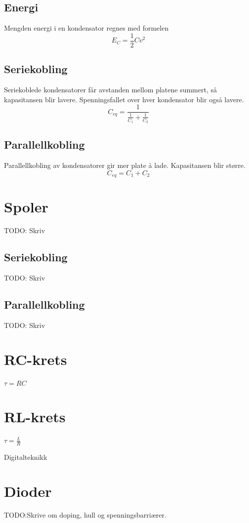 \documentclass[12pt,a4paper,norsk]{article}
\newcommand{\resi}[1]{\frac{1}{#1}}
\begin{document}
\subsection{Energi}
Mengden energi i en kondensator regnes med formelen
\[E_{C} = \resi{2} C v^{2}\]

\subsection{Seriekobling}
Seriekoblede kondensatorer får avstanden mellom platene summert, så kapasitansen
blir lavere. Spenningsfallet over hver kondensator blir også lavere.
\[C_{eq} = \resi{\resi{C_{1}}+\resi{C_{2}}}\]

\subsection{Parallellkobling}
Parallellkobling av kondensatorer gir mer plate å lade. Kapasitansen blir større.
\[C_{eq} = C_{1} + C_{2}\]

\section{Spoler}\label{sec:spoler}
TODO\@: Skriv
\subsection{Seriekobling}
TODO\@: Skriv
\subsection{Parallellkobling}
TODO\@: Skriv

\section{RC-krets}
$\tau = RC$

\section{RL-krets}
$\tau = \frac{L}{R}$

\clearpage
{}
\begin{center}
  {\LARGE Digitalteknikk}
\end{center}

\section{Dioder}\label{sec:dioder}
TODO\@:Skrive om doping, hull og spenningsbarriærer.
\end{document}
